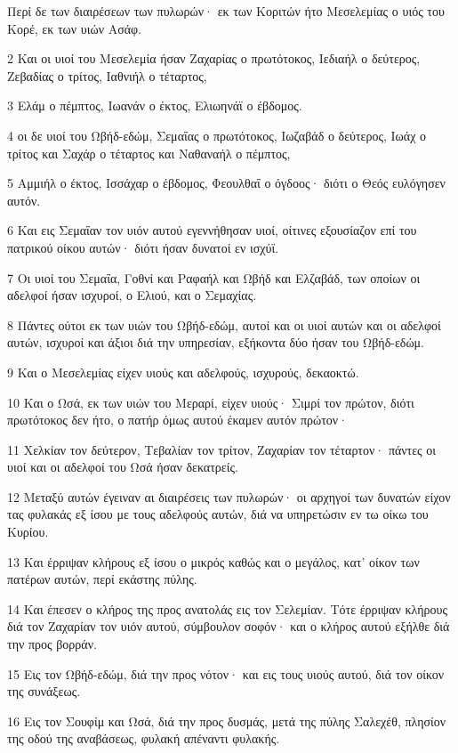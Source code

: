 \par Περί δε των διαιρέσεων των πυλωρών· εκ των Κοριτών ήτο Μεσελεμίας ο υιός του Κορέ, εκ των υιών Ασάφ.
\par 2 Και οι υιοί του Μεσελεμία ήσαν Ζαχαρίας ο πρωτότοκος, Ιεδιαήλ ο δεύτερος, Ζεβαδίας ο τρίτος, Ιαθνιήλ ο τέταρτος,
\par 3 Ελάμ ο πέμπτος, Ιωανάν ο έκτος, Ελιωηνάϊ ο έβδομος.
\par 4 οι δε υιοί του Ωβήδ-εδώμ, Σεμαΐας ο πρωτότοκος, Ιωζαβάδ ο δεύτερος, Ιωάχ ο τρίτος και Σαχάρ ο τέταρτος και Ναθαναήλ ο πέμπτος,
\par 5 Αμμιήλ ο έκτος, Ισσάχαρ ο έβδομος, Φεουλθαΐ ο όγδοος· διότι ο Θεός ευλόγησεν αυτόν.
\par 6 Και εις Σεμαΐαν τον υιόν αυτού εγεννήθησαν υιοί, οίτινες εξουσίαζον επί του πατρικού οίκου αυτών· διότι ήσαν δυνατοί εν ισχύϊ.
\par 7 Οι υιοί του Σεμαΐα, Γοθνί και Ραφαήλ και Ωβήδ και Ελζαβάδ, των οποίων οι αδελφοί ήσαν ισχυροί, ο Ελιού, και ο Σεμαχίας.
\par 8 Πάντες ούτοι εκ των υιών του Ωβήδ-εδώμ, αυτοί και οι υιοί αυτών και οι αδελφοί αυτών, ισχυροί και άξιοι διά την υπηρεσίαν, εξήκοντα δύο ήσαν του Ωβήδ-εδώμ.
\par 9 Και ο Μεσελεμίας είχεν υιούς και αδελφούς, ισχυρούς, δεκαοκτώ.
\par 10 Και ο Ωσά, εκ των υιών του Μεραρί, είχεν υιούς· Σιμρί τον πρώτον, διότι πρωτότοκος δεν ήτο, ο πατήρ όμως αυτού έκαμεν αυτόν πρώτον·
\par 11 Χελκίαν τον δεύτερον, Τεβαλίαν τον τρίτον, Ζαχαρίαν τον τέταρτον· πάντες οι υιοί και οι αδελφοί του Ωσά ήσαν δεκατρείς.
\par 12 Μεταξύ αυτών έγειναν αι διαιρέσεις των πυλωρών· οι αρχηγοί των δυνατών είχον τας φυλακάς εξ ίσου με τους αδελφούς αυτών, διά να υπηρετώσιν εν τω οίκω του Κυρίου.
\par 13 Και έρριψαν κλήρους εξ ίσου ο μικρός καθώς και ο μεγάλος, κατ' οίκον των πατέρων αυτών, περί εκάστης πύλης.
\par 14 Και έπεσεν ο κλήρος της προς ανατολάς εις τον Σελεμίαν. Τότε έρριψαν κλήρους διά τον Ζαχαρίαν τον υιόν αυτού, σύμβουλον σοφόν· και ο κλήρος αυτού εξήλθε διά την προς βορράν.
\par 15 Εις τον Ωβήδ-εδώμ, διά την προς νότον· και εις τους υιούς αυτού, διά τον οίκον της συνάξεως.
\par 16 Εις τον Σουφίμ και Ωσά, διά την προς δυσμάς, μετά της πύλης Σαλεχέθ, πλησίον της οδού της αναβάσεως, φυλακή απέναντι φυλακής.
